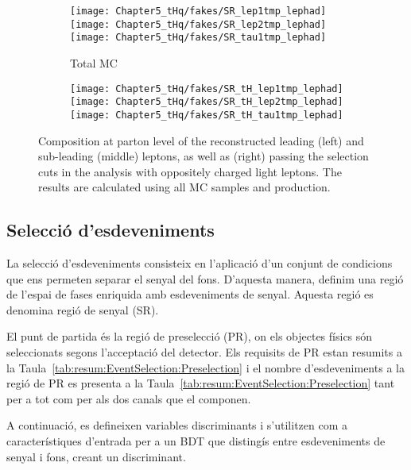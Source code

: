 \begin{figure}[h]
  \begin{subfigure}[b]{0.99\linewidth}
       \centering
       \texttt{[image: Chapter5\_tHq/fakes/SR\_lep1tmp\_lephad]}
       \texttt{[image: Chapter5\_tHq/fakes/SR\_lep2tmp\_lephad]}
       \texttt{[image: Chapter5\_tHq/fakes/SR\_tau1tmp\_lephad]}
       \caption{Total MC}
  \end{subfigure}
  \begin{subfigure}[b]{0.99\linewidth}
      \centering
      \texttt{[image: Chapter5\_tHq/fakes/SR\_tH\_lep1tmp\_lephad]}
      \texttt{[image: Chapter5\_tHq/fakes/SR\_tH\_lep2tmp\_lephad]}
      \texttt{[image: Chapter5\_tHq/fakes/SR\_tH\_tau1tmp\_lephad]}
      \caption{\tHq}
  \end{subfigure}
   \caption{Composition at parton level of the reconstructed leading (left) and sub-leading (middle) leptons, as well as \tauhad (right) passing the selection cuts in the \dileptau analysis with oppositely charged light leptons. The results are calculated using all MC samples and \tHq production.}
   \label{fig:resum:fakeCharts}
\end{figure}



\FloatBarrier
\subsection{Selecció d’esdeveniments}
\label{chap:resumen_val:tHq:Seleccio}
La selecció d'esdeveniments consisteix en l'aplicació d'un conjunt de condicions que ens 
permeten separar el senyal del fons. D'aquesta manera, definim una regió de l'espai de 
fases enriquida amb esdeveniments de senyal. Aquesta regió es denomina regió de senyal (SR).

El punt de partida és la regió de preselecció (PR), on els objectes físics són seleccionats 
segons l'acceptació del detector. Els requisits de PR estan resumits a la Taula~\ref{tab:resum:EventSelection:Preselection} 
i el nombre d'esdeveniments a la regió de PR es presenta a la Taula~\ref{tab:resum:EventSelection:Preselection}
tant per a tot \dileptau com per als dos canals que el componen.

A continuació, es defineixen variables discriminants i s'utilitzen
com a característiques d'entrada per a un BDT que distingís entre esdeveniments de senyal i 
fons, creant un discriminant.

